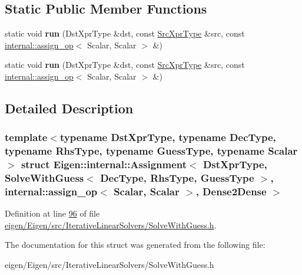 \subsection*{Static Public Member Functions}
\begin{DoxyCompactItemize}
\item 
\mbox{\label{struct_eigen_1_1internal_1_1_assignment_3_01_dst_xpr_type_00_01_solve_with_guess_3_01_dec_type_092a64ffd1d5684a219c114a5d8922118_a0eef72c6336c71b4ffb879fae3b8fdf5}} 
static void {\bfseries run} (Dst\+Xpr\+Type \&dst, const \hyperlink{group___iterative_linear_solvers___module_class_eigen_1_1_solve_with_guess}{Src\+Xpr\+Type} \&src, const \hyperlink{struct_eigen_1_1internal_1_1assign__op}{internal\+::assign\+\_\+op}$<$ Scalar, Scalar $>$ \&)
\item 
\mbox{\label{struct_eigen_1_1internal_1_1_assignment_3_01_dst_xpr_type_00_01_solve_with_guess_3_01_dec_type_092a64ffd1d5684a219c114a5d8922118_a0eef72c6336c71b4ffb879fae3b8fdf5}} 
static void {\bfseries run} (Dst\+Xpr\+Type \&dst, const \hyperlink{group___iterative_linear_solvers___module_class_eigen_1_1_solve_with_guess}{Src\+Xpr\+Type} \&src, const \hyperlink{struct_eigen_1_1internal_1_1assign__op}{internal\+::assign\+\_\+op}$<$ Scalar, Scalar $>$ \&)
\end{DoxyCompactItemize}


\subsection{Detailed Description}
\subsubsection*{template$<$typename Dst\+Xpr\+Type, typename Dec\+Type, typename Rhs\+Type, typename Guess\+Type, typename Scalar$>$\newline
struct Eigen\+::internal\+::\+Assignment$<$ Dst\+Xpr\+Type, Solve\+With\+Guess$<$ Dec\+Type, Rhs\+Type, Guess\+Type $>$, internal\+::assign\+\_\+op$<$ Scalar, Scalar $>$, Dense2\+Dense $>$}



Definition at line \hyperlink{eigen_2_eigen_2src_2_iterative_linear_solvers_2_solve_with_guess_8h_source_l00096}{96} of file \hyperlink{eigen_2_eigen_2src_2_iterative_linear_solvers_2_solve_with_guess_8h_source}{eigen/\+Eigen/src/\+Iterative\+Linear\+Solvers/\+Solve\+With\+Guess.\+h}.



The documentation for this struct was generated from the following file\+:\begin{DoxyCompactItemize}
\item 
eigen/\+Eigen/src/\+Iterative\+Linear\+Solvers/\+Solve\+With\+Guess.\+h\end{DoxyCompactItemize}
